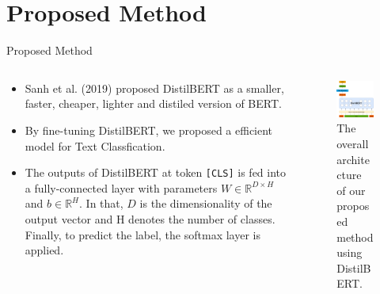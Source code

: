 \section{Proposed Method}
\begin{frame}{Proposed Method}
\begin{columns}
\begin{column}{.5\textwidth}
\begin{itemize}
\item Sanh et al. (2019)\cite{Sanh2019} proposed DistilBERT as a smaller, faster, cheaper, lighter and distiled version of BERT.
\item By fine-tuning DistilBERT, we proposed a efficient model for Text Classfication.
\item The outputs of DistilBERT at token \texttt{[CLS]} is fed into a fully-connected layer with parameters $W \in \mathbb{R}^{D\times H}$ and $b \in \mathbb{R}^H$. In that, $D$ is the dimensionality of the output vector and H denotes the number of classes. Finally, to predict the label, the softmax layer is applied.
\end{itemize}

\end{column}

\begin{column}{.5\textwidth}
\begin{figure}[htp]
\centering
\includegraphics[scale=.3]{img/distilbert.png}
\caption{The overall architecture of our proposed method using DistilBERT.}
\end{figure}
\end{column}
\end{columns}
\end{frame}